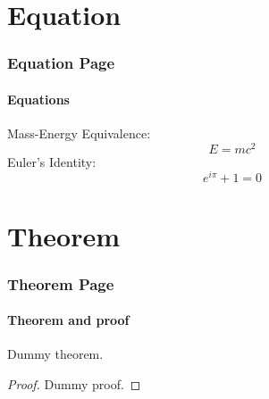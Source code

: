 \documentclass[10pt]{beamer}
\begin{document}

\section{Equation}
\begin{frame}
\frametitle{Equation Page}
\framesubtitle{Equations}
Mass-Energy Equivalence:
\begin{equation}
E=mc^2
\end{equation}
Euler's Identity:
\begin{equation}
e^{i\pi}+1=0
\end{equation}
\end{frame}


\section{Theorem}
\begin{frame}
\frametitle{Theorem Page}
\framesubtitle{Theorem and proof}
\begin{theorem}
Dummy theorem.
\end{theorem}
\begin{proof}
Dummy proof.
\end{proof}
\end{frame}

\end{document}
